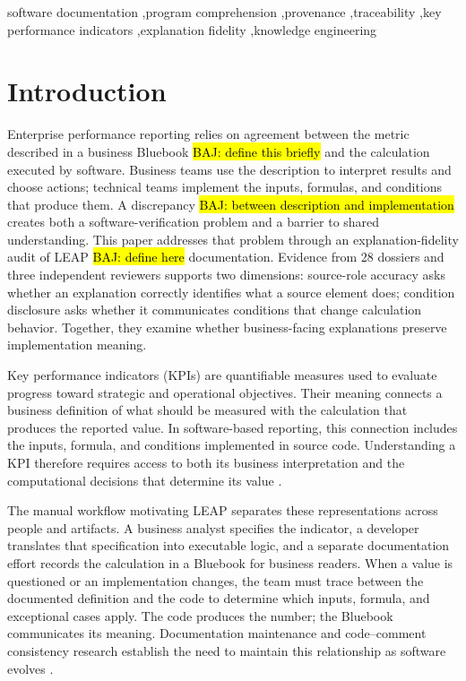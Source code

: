 \documentclass[a4paper,fleqn]{cas-dc}
\newcommand{\baj}[1]{{\sethlcolor{yellow}\hl{BAJ: #1}}}
\begin{document}
\begin{keywords}
software documentation \sep program comprehension \sep provenance \sep traceability \sep key performance indicators \sep explanation fidelity \sep knowledge engineering
\end{keywords}
\maketitle
{}

\section{Introduction}

Enterprise performance reporting relies on agreement between the metric described in a business Bluebook \baj{define this briefly} and the calculation executed by software. Business teams use the description to interpret results and choose actions; technical teams implement the inputs, formulas, and conditions that produce them. A discrepancy \baj{between description and implementation} creates both a software-verification problem and a barrier to shared understanding. This paper addresses that problem through an explanation-fidelity audit of LEAP \baj{define here} documentation. Evidence from 28 dossiers and three independent reviewers supports two dimensions: source-role accuracy asks whether an explanation correctly identifies what a source element does; condition disclosure asks whether it communicates conditions that change calculation behavior. Together, they examine whether business-facing explanations preserve implementation meaning.

Key performance indicators (KPIs) are quantifiable measures used to evaluate progress toward strategic and operational objectives. Their meaning connects a business definition of what should be measured with the calculation that produces the reported value. In software-based reporting, this connection includes the inputs, formula, and conditions implemented in source code. Understanding a KPI therefore requires access to both its business interpretation and the computational decisions that determine its value \citep{Mate2017,RoldanGarcia2021}.

The manual workflow motivating LEAP separates these representations across people and artifacts. A business analyst specifies the indicator, a developer translates that specification into executable logic, and a separate documentation effort records the calculation in a Bluebook for business readers. When a value is questioned or an implementation changes, the team must trace between the documented definition and the code to determine which inputs, formula, and exceptional cases apply. The code produces the number; the Bluebook communicates its meaning. Documentation maintenance and code--comment consistency research establish the need to maintain this relationship as software evolves \citep{Aghajani2019,Wen2019,Xu2024}.
\end{document}
